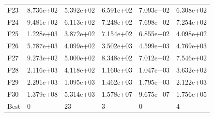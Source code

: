 \begin{tabular}{llllll}
F23  &  8.736e+02 &  5.392e+02 &  6.591e+02 &  7.093e+02 &  6.308e+02 \\
F24  &  9.481e+02 &  6.113e+02 &  7.248e+02 &  7.698e+02 &  7.254e+02 \\
F25  &  1.228e+03 &  3.872e+02 &  7.154e+02 &  6.855e+02 &  4.098e+02 \\
F26  &  5.787e+03 &  4.099e+02 &  3.502e+03 &  4.599e+03 &  4.769e+03 \\
F27  &  9.273e+02 &  5.000e+02 &  8.348e+02 &  7.012e+02 &  7.546e+02 \\
F28  &  2.116e+03 &  4.118e+02 &  1.160e+03 &  1.047e+03 &  3.632e+02 \\
F29  &  2.291e+03 &  1.095e+03 &  1.462e+03 &  1.795e+03 &  2.122e+03 \\
F30  &  1.379e+08 &  5.314e+03 &  1.578e+07 &  9.675e+07 &  1.756e+05 \\
Best &          0 &         23 &          3 &          0 &          4 \\
\bottomrule
\end{tabular}
